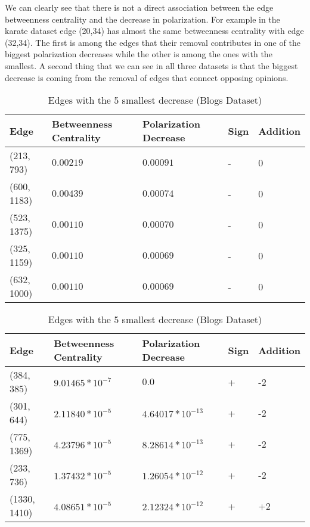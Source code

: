 We can clearly see that there is not a direct association between the edge betweenness centrality and the decrease in polarization. For example in the karate dataset edge (20,34) has almost the same betweenness centrality with edge (32,34). The first is among the edges that their removal contributes in one of the biggest polarization decreases while the other is among the ones with the smallest. A second thing that we can see in all three datasets is that the biggest decrease is coming from the removal of edges that connect opposing opinions.

\begin{table}[htbp]
 \centering
 \caption{Edges with the 5 largest decrease (Blogs Dataset)}
 \label{tab:edgesLargest}
 \begin{tabular}{| l || l | l | l | l |}
 \hline
  Edge & Betweenness Centrality & Polarization Decrease & Sign & Addition\\
  \hline
  \hline
  (213, 793) & $0.00219$ & $0.00091$ & - &  0\\
  \hline
  (600, 1183) & $0.00439$ & $0.00074$ & - &  0\\
  \hline
  (523, 1375) & $0.00110$ & $0.00070$ & - &  0\\
  \hline
  (325, 1159) & $0.00110$ & $0.00069$ & - &  0\\
  \hline
  (632, 1000) & $0.00110$ & $0.00069$ & - &  0\\
  \hline
 \end{tabular}
 
 
 \caption{Edges with the 5 smallest decrease (Blogs Dataset)}
 \label{tab:edgesLargest}
 \begin{tabular}{| l || l | l | l | l |}
 \hline
  Edge & Betweenness Centrality & Polarization Decrease & Sign & Addition\\
  \hline
  \hline
  (384, 385) & $9.01465*10^{-7}$ & $0.0$ & + &  -2\\
  \hline
  (301, 644) & $2.11840*10^{-5}$ & $4.64017*10^{-13}$ & + &  -2\\
  \hline
  (775, 1369) & $4.23796*10^{-5}$ & $8.28614*10^{-13}$ & + &  -2\\
  \hline
  (233, 736) & $1.37432*10^{-5}$ & $1.26054*10^{-12}$ & + &  -2\\
  \hline
  (1330, 1410) & $4.08651*10^{-5}$ & $2.12324*10^{-12}$ & + &  +2\\
  \hline
  \hline
 \end{tabular}
 
\end{table}



